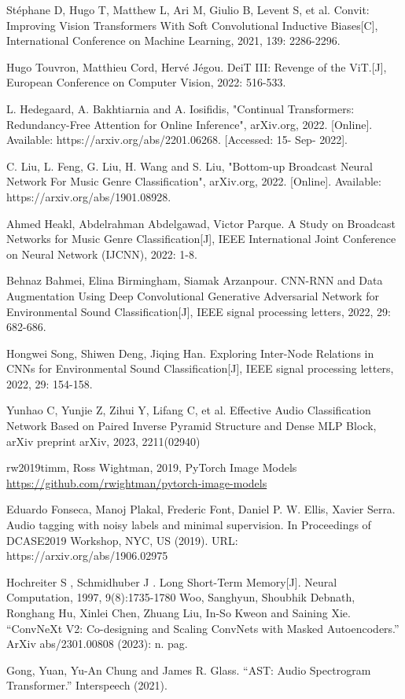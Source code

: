 \documentclass[runningheads]{llncs}
\begin{document}
\begin{thebibliography}{8}
\bibitem{} Stéphane D, Hugo T, Matthew L, Ari M, Giulio B, Levent S, et al. Convit: Improving Vision Transformers With Soft Convolutional Inductive Biases[C], International Conference on Machine Learning, 2021, 139: 2286-2296.

\bibitem{} Hugo Touvron, Matthieu Cord, Hervé Jégou. DeiT III: Revenge of the ViT.[J], European Conference on Computer Vision, 2022: 516-533.

\bibitem{} L. Hedegaard, A. Bakhtiarnia and A. Iosifidis, "Continual Transformers: Redundancy-Free Attention for Online Inference", arXiv.org, 2022. [Online]. Available: https://arxiv.org/abs/2201.06268. [Accessed: 15- Sep- 2022].

\bibitem{} C. Liu, L. Feng, G. Liu, H. Wang and S. Liu, "Bottom-up Broadcast Neural Network For Music Genre Classification", arXiv.org, 2022. [Online]. Available: https://arxiv.org/abs/1901.08928.

\bibitem{} Ahmed Heakl, Abdelrahman Abdelgawad, Victor Parque. A Study on Broadcast Networks for Music Genre Classification[J], IEEE International Joint Conference on Neural Network (IJCNN), 2022: 1-8.

\bibitem{} Behnaz Bahmei, Elina Birmingham, Siamak Arzanpour. CNN-RNN and Data Augmentation Using Deep Convolutional Generative Adversarial Network for Environmental Sound Classification[J], IEEE signal processing letters, 2022, 29: 682-686.

\bibitem{} Hongwei Song, Shiwen Deng, Jiqing Han. Exploring Inter-Node Relations in CNNs for Environmental Sound Classification[J], IEEE signal processing letters, 2022, 29: 154-158.

\bibitem{} Yunhao C, Yunjie Z, Zihui Y, Lifang C, et al. Effective Audio Classification Network Based on Paired Inverse Pyramid
Structure and Dense MLP Block, arXiv preprint arXiv, 2023, 2211(02940)

 rw2019timm,
  Ross Wightman, 2019, PyTorch Image Models \url{https://github.com/rwightman/pytorch-image-models}

Eduardo Fonseca, Manoj Plakal, Frederic Font, Daniel P. W. Ellis, Xavier Serra. Audio tagging with noisy labels and minimal supervision. In Proceedings of DCASE2019 Workshop, NYC, US (2019). URL: https://arxiv.org/abs/1906.02975

\bibitem{}Hochreiter S ,  Schmidhuber J . Long Short-Term Memory[J]. Neural Computation, 1997, 9(8):1735-1780
\bibitem{}Woo, Sanghyun, Shoubhik Debnath, Ronghang Hu, Xinlei Chen, Zhuang Liu, In-So Kweon and Saining Xie. “ConvNeXt V2: Co-designing and Scaling ConvNets with Masked Autoencoders.” ArXiv abs/2301.00808 (2023): n. pag.

\bibitem{}Gong, Yuan, Yu-An Chung and James R. Glass. “AST: Audio Spectrogram Transformer.” Interspeech (2021).

\end{thebibliography}
\end{document}
